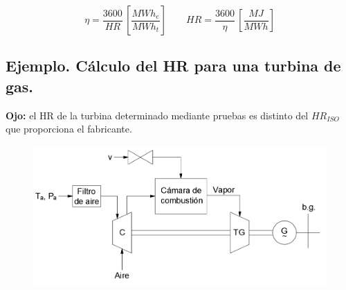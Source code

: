 			\[\eta = \dfrac{3600}{H\!R}\,\left[\dfrac{MWh_e}{MWh_t}\right] \qquad 
			H\!R = \dfrac{3600}{\eta}\,\left[\dfrac{MJ}{MWh}\right]\]
			
		\newpage
		\subsection*{Ejemplo. Cálculo del HR para una turbina de gas.}
			\textbf{Ojo:} el HR de la turbina determinado mediante pruebas es distinto del $H\!R_{ISO}$ que proporciona el fabricante.
			
			\begin{figure}[H]
				\centering
				\includegraphics[width=0.7\linewidth]{res/tema5/turbinaGas}
				\label{fig:turbinagas}
			\end{figure}
			\vspace{-1cm}
